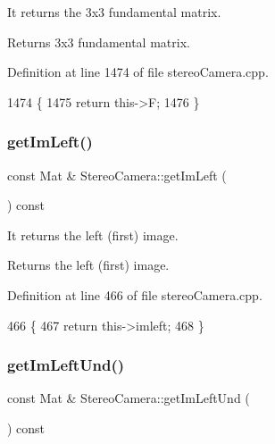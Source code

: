 It returns the 3x3 fundamental matrix. 

\begin{DoxyReturn}{Returns}
3x3 fundamental matrix. 
\end{DoxyReturn}


Definition at line 1474 of file stereo\+Camera.\+cpp.


\begin{DoxyCode}
1474                                               \{
1475     \textcolor{keywordflow}{return} this->F;
1476 \}
\end{DoxyCode}
\mbox{\label{classStereoCamera_ac0cb76a6994bd7ab915cb02d83cf8f8e}} 
\subsubsection{\texorpdfstring{get\+Im\+Left()}{getImLeft()}}
{\footnotesize\ttfamily const Mat \& Stereo\+Camera\+::get\+Im\+Left (\begin{DoxyParamCaption}{ }\end{DoxyParamCaption}) const}



It returns the left (first) image. 

\begin{DoxyReturn}{Returns}
the left (first) image. 
\end{DoxyReturn}


Definition at line 466 of file stereo\+Camera.\+cpp.


\begin{DoxyCode}
466                                          \{
467     \textcolor{keywordflow}{return} this->imleft;
468 \}
\end{DoxyCode}
\mbox{\label{classStereoCamera_a52ba4f0331f3690ca0f983b10bd0c783}} 
\subsubsection{\texorpdfstring{get\+Im\+Left\+Und()}{getImLeftUnd()}}
{\footnotesize\ttfamily const Mat \& Stereo\+Camera\+::get\+Im\+Left\+Und (\begin{DoxyParamCaption}{ }\end{DoxyParamCaption}) const}



